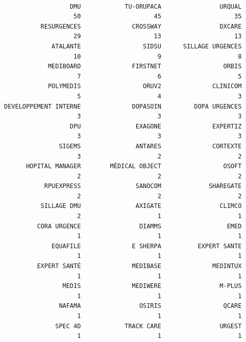 \documentclass[]{article}
\begin{document}
\begin{verbatim}

                  DMU            TU-ORUPACA                URQUAL 
                   50                    45                    35 
          RESURGENCES              CROSSWAY                DXCARE 
                   29                    13                    13 
             ATALANTE                 SIDSU      SILLAGE URGENCES 
                   10                     9                     8 
            MEDIBOARD              FIRSTNET                 ORBIS 
                    7                     6                     5 
            POLYMEDIS                 ORUV2              CLINICOM 
                    5                     4                     3 
DEVELOPPEMENT INTERNE              DOPASOIN         DOPA URGENCES 
                    3                     3                     3 
                  DPU               EXAGONE              EXPERTIZ 
                    3                     3                     3 
               SIGEMS               ANTARES              CORTEXTE 
                    3                     2                     2 
      HOPITAL MANAGER        MÉDICAL OBJECT                 OSOFT 
                    2                     2                     2 
           RPUEXPRESS               SANOCOM             SHAREGATE 
                    2                     2                     2 
          SILLAGE DMU               AXIGATE                CLIMCO 
                    2                     1                     1 
         CORA URGENCE                DIAMMS                  EMED 
                    1                     1                     1 
             EQUAFILE              E SHERPA          EXPERT SANTE 
                    1                     1                     1 
         EXPERT SANTÉ              MEDIBASE              MEDINTUX 
                    1                     1                     1 
                MEDIS              MEDIWERE                M-PLUS 
                    1                     1                     1 
               NAFAMA                OSIRIS                 QCARE 
                    1                     1                     1 
              SPEC 4D            TRACK CARE                URGEST 
                    1                     1                     1 
\end{verbatim}
\end{document}
